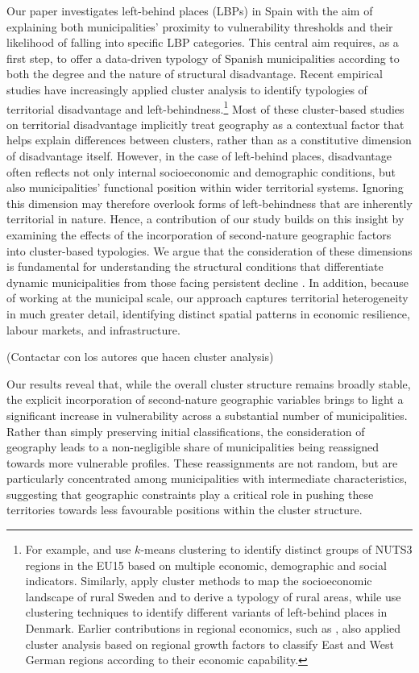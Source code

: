 \documentclass[a4paper,11pt,oneside]{article}
\begin{document}
Our paper investigates left-behind places (LBPs) in Spain with the aim of explaining both municipalities' proximity to vulnerability thresholds and their likelihood of falling into specific LBP categories. This central aim requires, as a first step, to offer a data-driven typology of Spanish municipalities according to both the degree and the nature of structural disadvantage. Recent empirical studies have increasingly applied cluster analysis to identify typologies of territorial disadvantage and left-behindness.\footnote{For example, \cite{le2025identifying} and \cite{velthuis2024regional} use $k$-means clustering to identify distinct groups of NUTS3 regions in the EU15 based on multiple economic, demographic and social indicators. Similarly, \cite{hedlund2016mapping} apply cluster methods to map the socioeconomic landscape of rural Sweden and to derive a typology of rural areas, while \cite{jessen2024role} use clustering techniques to identify different variants of left-behind places in Denmark. Earlier contributions in regional economics, such as \cite{kronthaler2005economic}, also applied cluster analysis based on regional growth factors to classify East and West German regions according to their economic capability.} Most of these cluster-based studies on territorial disadvantage implicitly treat geography as a contextual factor that helps explain differences between clusters, rather than as a constitutive dimension of disadvantage itself. However, in the case of left-behind places, disadvantage often reflects not only internal socioeconomic and demographic conditions, but also municipalities' functional position within wider territorial systems. Ignoring this dimension may therefore overlook forms of left-behindness that are inherently territorial in nature. Hence, a contribution of our study builds on this insight by examining the effects of the incorporation of second-nature geographic factors into cluster-based typologies. We argue that the consideration of these dimensions is fundamental for understanding the structural conditions that differentiate dynamic municipalities from those facing persistent decline \citep{velthuis2024regional}. In addition, because of working at the municipal scale, our approach captures territorial heterogeneity in much greater detail, identifying distinct spatial patterns in economic resilience, labour markets, and infrastructure.

{\color{red} (Contactar con los autores que hacen cluster analysis)}


Our results reveal that, while the overall cluster structure remains broadly stable, the explicit incorporation of second-nature geographic variables brings to light a significant increase in vulnerability across a substantial number of municipalities. Rather than simply preserving initial classifications, the consideration of geography leads to a non-negligible share of municipalities being reassigned towards more vulnerable profiles. These reassignments are not random, but are particularly concentrated among municipalities with intermediate characteristics, suggesting that geographic constraints play a critical role in pushing these territories towards less favourable positions within the cluster structure.
\end{document}
